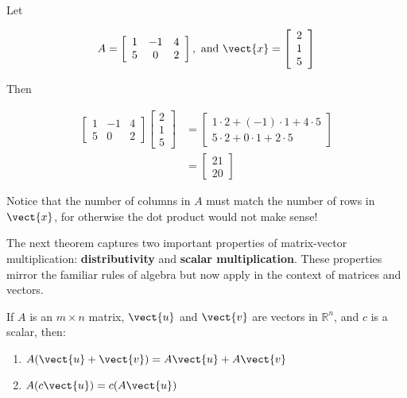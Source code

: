 \begin{example} Let

\[
A=\left[\begin{array}{ccc}
1 & -1 & 4 \\
5 & 0 & 2
\end{array}\right], \text { and } \vect{x}=\left[\begin{array}{l}
2 \\
1 \\
5
\end{array}\right]
\]

Then

\[
\begin{aligned}
{\left[\begin{array}{ccc}
1 & -1 & 4 \\
5 & 0 & 2
\end{array}\right]\left[\begin{array}{l}
2 \\
1 \\
5
\end{array}\right] } & =\left[\begin{array}{c}
1 \cdot 2+(-1) \cdot 1+4 \cdot 5 \\
5 \cdot 2+0 \cdot 1+2 \cdot 5
\end{array}\right] \\
& =\left[\begin{array}{c}
21 \\
20
\end{array}\right]
\end{aligned}
\]
\end{example}

Notice that the number of columns in $A$ must match the number of rows in $\vect{x}$, for otherwise the dot product would not make sense!

The next theorem captures two important properties of matrix-vector multiplication: \textbf{distributivity} and \textbf{scalar multiplication}. These properties mirror the familiar rules of algebra but now apply in the context of matrices and vectors.

\begin{theorem}
If \( A \) is an \( m \times n \) matrix, \( \vect{u} \) and \( \vect{v} \) are vectors in \( \mathbb{R}^n \), and \( c \) is a scalar, then:

\begin{enumerate}[label=(\alph*)]
    \item \( A(\vect{u} + \vect{v}) = A \vect{u} + A \vect{v} \)  


    \item \( A(c \vect{u}) = c(A \vect{u}) \)  

\end{enumerate}
\end{theorem}

